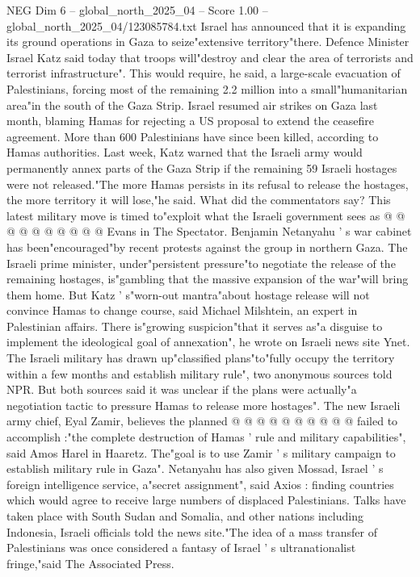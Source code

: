 \begin{textsample}{NEG Dim 6 – global\_north\_2025\_04 – Score 1.00 – global\_north\_2025\_04/123085784.txt}  \label{ex:f6_neg_244}
Israel has announced that it is expanding its ground operations in Gaza to seize"extensive territory"there.
Defence Minister Israel Katz said today that troops will"destroy and clear the area of terrorists and terrorist infrastructure".
This would require, he said, a large-scale evacuation of Palestinians, forcing most of the remaining 2.2 million into a small"humanitarian area"in the south of the Gaza Strip.
Israel resumed air strikes on Gaza last month, blaming Hamas for rejecting a US proposal to extend the ceasefire agreement.
More than 600 Palestinians have since been killed, according to Hamas authorities.
Last week, Katz warned that the Israeli army would permanently annex parts of the Gaza Strip if the remaining 59 Israeli hostages were not released."The more Hamas persists in its refusal to release the hostages, the more territory it will lose,"he said.
What did the commentators say?
This latest military move is timed to"exploit what the Israeli government sees as @ @ @ @ @ @ @ @ @ @ Evans in The Spectator.
Benjamin Netanyahu ' s war cabinet has been"encouraged"by recent protests against the group in northern Gaza.
The Israeli prime minister, under"persistent pressure"to negotiate the release of the remaining hostages, is"gambling that the massive expansion of the war"will bring them home.
But Katz ' s"worn-out mantra"about hostage release will not convince Hamas to change course, said Michael Milshtein, an expert in Palestinian affairs.
There is"growing suspicion"that it serves as"a disguise to implement the ideological goal of annexation", he wrote on Israeli news site Ynet.
The Israeli military has drawn up"classified plans"to"fully occupy the territory within a few months and establish military rule", two anonymous sources told NPR.
But both sources said it was unclear if the plans were actually"a negotiation tactic to pressure Hamas to release more hostages".
The new Israeli army chief, Eyal Zamir, believes the planned @ @ @ @ @ @ @ @ @ @ failed to accomplish :"the complete destruction of Hamas ' rule and military capabilities", said Amos Harel in Haaretz.
The"goal is to use Zamir ' s military campaign to establish military rule in Gaza".
Netanyahu has also given Mossad, Israel ' s foreign intelligence service, a"secret assignment", said Axios : finding countries which would agree to receive large numbers of displaced Palestinians.
Talks have taken place with South Sudan and Somalia, and other nations including Indonesia, Israeli officials told the news site."The idea of a mass transfer of Palestinians was once considered a fantasy of Israel ' s ultranationalist fringe,"said The Associated Press.

\end{textsample}
